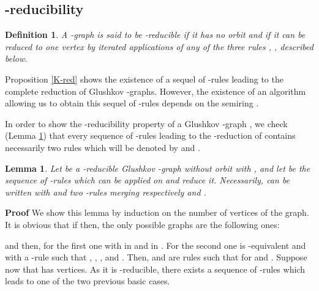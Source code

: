 \documentclass[11pt]{article}
\newtheorem{definition}[theorem]{Definition}
\newtheorem{lemma}[theorem]{Lemma}
\begin{document}
\subsection{-reducibility}
\begin{definition}
A -graph  is  said to be {\it -reducible} if it has no orbit and if it can be  reduced to one vertex by  iterated applications of any of the three rules , ,  described below.
\end{definition}




Proposition \ref{K-red}  shows the existence of a sequel of -rules leading to the complete reduction of Glushkov -graphs. However, the existence of an algorithm allowing us to obtain this sequel of -rules depends on the semiring .

In order to show the -reducibility property of a Glushkov -graph , we check (Lemma \ref{2R1}) that every sequence  of -rules leading to the -reduction of  contains necessarily two  rules which will be denoted by  and .
\begin{lemma}\label{2R1}
Let  be a -reducible Glushkov -graph without orbit with , and let  be the sequence of -rules which can be applied on  and reduce it. Necessarily,  can be written  with  and   two -rules merging respectively  and .
\end{lemma}
{\bf Proof }We show this lemma by induction on the number of vertices of the graph. It is obvious that if  then, the only possible graphs are the following ones:


\noindent
and then, for the first one  with  in  and  in . For the second one  is -equivalent and  with  a -rule such that  ,  , ,  and . Then,   and  are  rules such that   for  and . Suppose now that  has  vertices. As it is -reducible, there exists a sequence of -rules which leads to one of the two previous basic cases.\cqfd 
 
\end{document}
